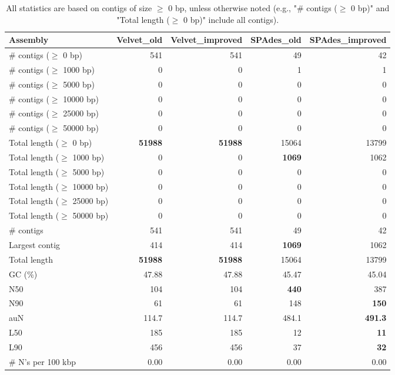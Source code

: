 \documentclass[12pt,a4paper]{article}
\begin{document}
\begin{table}[ht]
\begin{center}
\caption{All statistics are based on contigs of size $\geq$ 0 bp, unless otherwise noted (e.g., "\# contigs ($\geq$ 0 bp)" and "Total length ($\geq$ 0 bp)" include all contigs).}
\begin{tabular}{|l*{4}{|r}|}
\hline
Assembly & Velvet\_old & Velvet\_improved & SPAdes\_old & SPAdes\_improved \\ \hline
\# contigs ($\geq$ 0 bp) & 541 & 541 & 49 & 42 \\ \hline
\# contigs ($\geq$ 1000 bp) & 0 & 0 & 1 & 1 \\ \hline
\# contigs ($\geq$ 5000 bp) & 0 & 0 & 0 & 0 \\ \hline
\# contigs ($\geq$ 10000 bp) & 0 & 0 & 0 & 0 \\ \hline
\# contigs ($\geq$ 25000 bp) & 0 & 0 & 0 & 0 \\ \hline
\# contigs ($\geq$ 50000 bp) & 0 & 0 & 0 & 0 \\ \hline
Total length ($\geq$ 0 bp) & {\bf 51988} & {\bf 51988} & 15064 & 13799 \\ \hline
Total length ($\geq$ 1000 bp) & 0 & 0 & {\bf 1069} & 1062 \\ \hline
Total length ($\geq$ 5000 bp) & 0 & 0 & 0 & 0 \\ \hline
Total length ($\geq$ 10000 bp) & 0 & 0 & 0 & 0 \\ \hline
Total length ($\geq$ 25000 bp) & 0 & 0 & 0 & 0 \\ \hline
Total length ($\geq$ 50000 bp) & 0 & 0 & 0 & 0 \\ \hline
\# contigs & 541 & 541 & 49 & 42 \\ \hline
Largest contig & 414 & 414 & {\bf 1069} & 1062 \\ \hline
Total length & {\bf 51988} & {\bf 51988} & 15064 & 13799 \\ \hline
GC (\%) & 47.88 & 47.88 & 45.47 & 45.04 \\ \hline
N50 & 104 & 104 & {\bf 440} & 387 \\ \hline
N90 & 61 & 61 & 148 & {\bf 150} \\ \hline
auN & 114.7 & 114.7 & 484.1 & {\bf 491.3} \\ \hline
L50 & 185 & 185 & 12 & {\bf 11} \\ \hline
L90 & 456 & 456 & 37 & {\bf 32} \\ \hline
\# N's per 100 kbp & 0.00 & 0.00 & 0.00 & 0.00 \\ \hline
\end{tabular}
\end{center}
\end{table}
\end{document}
